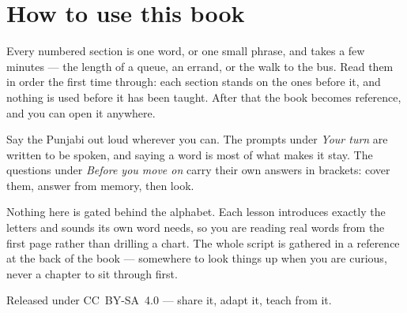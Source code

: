 \documentclass[11pt,twoside]{book}
\begin{document}
\section*{How to use this book}

Every numbered section is one word, or one small phrase, and takes a few
minutes --- the length of a queue, an errand, or the walk to the bus. Read them
in order the first time through: each section stands on the ones before it, and
nothing is used before it has been taught. After that the book becomes
reference, and you can open it anywhere.

Say the Punjabi out loud wherever you can. The prompts under \emph{Your turn}
are written to be spoken, and saying a word is most of what makes it stay. The
questions under \emph{Before you move on} carry their own answers in brackets:
cover them, answer from memory, then look.

Nothing here is gated behind the alphabet. Each lesson introduces exactly the
letters and sounds its own word needs, so you are reading real words from the
first page rather than drilling a chart. The whole script is gathered in a
reference at the back of the book --- somewhere to look things up when you are
curious, never a chapter to sit through first.

Released under CC~BY-SA~4.0 --- share it, adapt it, teach from it.

\tableofcontents

\mainmatter


\end{document}
